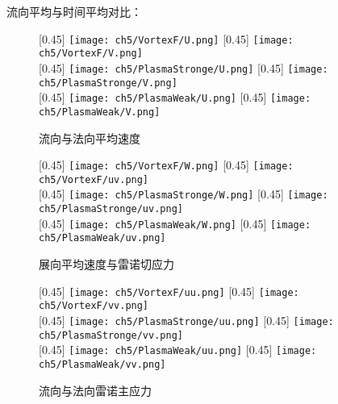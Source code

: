 流向平均与时间平均对比：
\begin{figure}[h]
  \centering
  [0.45\textwidth]
    {\texttt{[image: ch5/VortexF/U.png]}}
  [0.45\textwidth]
    {\texttt{[image: ch5/VortexF/V.png]}}
  \\\bigskip
  [0.45\textwidth]
    {\texttt{[image: ch5/PlasmaStronge/U.png]}}
  [0.45\textwidth]
    {\texttt{[image: ch5/PlasmaStronge/V.png]}}
  \\\bigskip
  [0.45\textwidth]
    {\texttt{[image: ch5/PlasmaWeak/U.png]}}
  [0.45\textwidth]
    {\texttt{[image: ch5/PlasmaWeak/V.png]}}
  \caption{流向与法向平均速度}
\end{figure}
\begin{figure}[h]
  \centering
  [0.45\textwidth]
    {\texttt{[image: ch5/VortexF/W.png]}}
  [0.45\textwidth]
    {\texttt{[image: ch5/VortexF/uv.png]}}
  \\\bigskip
  [0.45\textwidth]
    {\texttt{[image: ch5/PlasmaStronge/W.png]}}
  [0.45\textwidth]
    {\texttt{[image: ch5/PlasmaStronge/uv.png]}}
  \\\bigskip
  [0.45\textwidth]
    {\texttt{[image: ch5/PlasmaWeak/W.png]}}
  [0.45\textwidth]
    {\texttt{[image: ch5/PlasmaWeak/uv.png]}}
  \caption{展向平均速度与雷诺切应力}
\end{figure}
\begin{figure}[h]
  \centering
  [0.45\textwidth]
    {\texttt{[image: ch5/VortexF/uu.png]}}
  [0.45\textwidth]
    {\texttt{[image: ch5/VortexF/vv.png]}}
  \\\bigskip
  [0.45\textwidth]
    {\texttt{[image: ch5/PlasmaStronge/uu.png]}}
  [0.45\textwidth]
    {\texttt{[image: ch5/PlasmaStronge/vv.png]}}
  \\\bigskip
  [0.45\textwidth]
    {\texttt{[image: ch5/PlasmaWeak/uu.png]}}
  [0.45\textwidth]
    {\texttt{[image: ch5/PlasmaWeak/vv.png]}}
  \caption{流向与法向雷诺主应力}
\end{figure}
